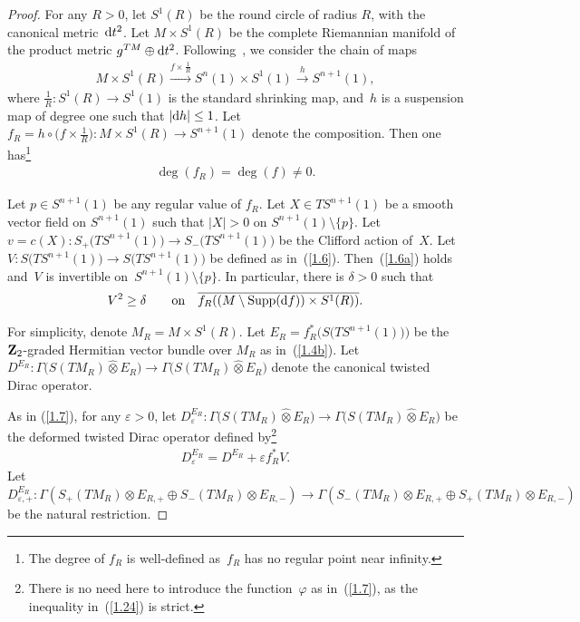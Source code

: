 \documentclass[10pt,a4paper]{amsart}
\numberwithin{equation}{section}
\theoremstyle{definition}
\begin{document}
\begin{proof} For any $R>0$, let $S^1(R)$ be the round circle of radius $R$, with the canonical met\-ric~${\rm d}t^2$. Let $M\times S^1(R)$ be the complete Riemannian manifold of the product metric $g^{TM}\oplus {\rm d}t^2$. Follo\-wing~\cite{L98}, we consider the chain of maps
\begin{gather*}%
 M\times S^1(R)\xrightarrow{f\times \frac{1}{R}} S^n(1)\times S^1(1) \xrightarrow{h} S^{n+1}(1),
\end{gather*}
where $\frac{1}{R}\colon S^1(R)\rightarrow S^1(1)$ is the standard shrinking map, and~$h$ is a suspension map of degree one such that $|{\rm d}h|\leq 1$. Let $f_R=h\circ \big(f\times \frac{1}{R}\big)\colon M\times S^1(R)\rightarrow S^{n+1}(1)$ denote the composition. Then one has\footnote{The degree of $f_R$ is well-defined as~$f_R$ has no regular point near infinity.}
\begin{gather}\label{1.27}
 \deg (f_R)=\deg (f)\neq 0.
\end{gather}

Let $p\in S^{n+1}(1) $ be any regular value of $f_R$. Let $X\in TS^{n+1}(1)$ be a smooth vector field on $S^{n+1}(1)$ such that $|X|>0$ on $S^{n+1}(1)\setminus \{p\}$.
Let $v=c(X)\colon S_+\big(TS^{n+1}(1)\big)\rightarrow S_-\big(TS^{n+1}(1)\big)$ be the Clifford action of~$X$. Let $V\colon S\big(TS^{n+1}(1)\big)\rightarrow S\big(TS^{n+1}(1)\big)$ be defined as in~(\ref{1.6}). Then~(\ref{1.6a}) holds and~$V$ is invertible on~$ S^{n+1}(1)\setminus \{p\}$. In particular, there is $\delta>0$ such that
\begin{gather}\label{1.29}
V^2 \geq \delta \qquad {\rm on}\quad \overline{f_R((M\setminus \operatorname{Supp}({\rm d}f))\times S^1(R)) }.
\end{gather}

For simplicity, denote $M_R=M\times S^1(R)$. Let $E_R =f_R^*\big(S\big(TS^{n+1}(1)\big)\big)$ be the ${\bf Z}_2$-graded Hermitian vector bundle over $M_R$ as in~(\ref{1.4b}).
Let $D^{E_R}\colon \Gamma\big(S(TM_R)\widehat\otimes E_R\big)\rightarrow
\Gamma\big(S(TM_R)\widehat\otimes E_R\big)$ denote the canonical twisted Dirac operator.

As in (\ref{1.7}), for any $\varepsilon>0$,
let $D^{E_R}_\varepsilon\colon \Gamma\big(S(TM_R)\widehat\otimes E_R\big)\rightarrow
\Gamma\big(S(TM_R)\widehat\otimes E_R\big)$ be the deformed twisted Dirac operator defined by\footnote{There is no need here to introduce the function~$\varphi$ as in~(\ref{1.7}), as the inequality in~(\ref{1.24}) is strict.}
\begin{gather*}%
D^{E_R}_\varepsilon =D^{E_R}+\varepsilon f_R^*V.
\end{gather*}
Let $D^{E_R}_{\varepsilon,+}\colon \Gamma (S_+(TM_R) \otimes E_{R,+}\oplus S_-(TM_R)\otimes E_{R,-} ) \rightarrow \Gamma(S_-(TM_R) \otimes E_{R,+}\oplus S_+(TM_R)\otimes E_{R,-}) $ be the natural restriction.


\end{proof}
\end{document}
